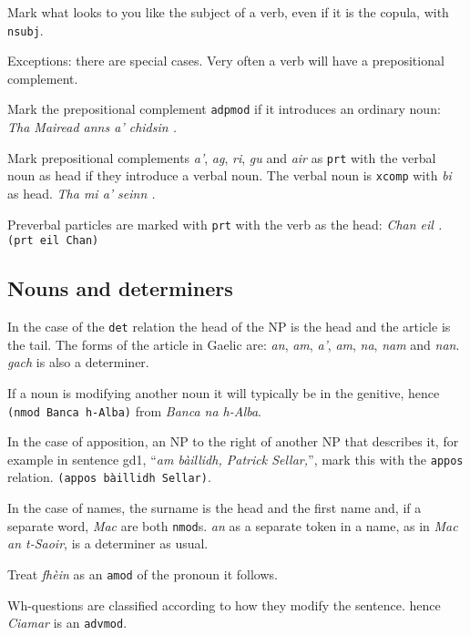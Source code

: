 \documentclass[a4paper]{article}
\begin{document}
 Mark what looks to you like the subject of a verb, even if it is the copula, with \texttt{nsubj}.

Exceptions: there are special cases.
Very often a verb will have a prepositional complement.

 Mark the prepositional complement \texttt{adpmod} if it introduces an ordinary noun: \textit{Tha Mairead anns a' chidsin .}

 Mark prepositional complements \textit{a'}, \textit{ag}, \textit{ri}, \textit{gu} and \textit{air} as \texttt{prt} with the verbal noun as head if they introduce a verbal noun. The verbal noun is \texttt{xcomp} with \textit{bi} as head. \textit{Tha mi a' seinn .}

 Preverbal particles are marked with \texttt{prt} with the verb as the head: \textit{Chan eil .} \texttt{(prt eil Chan)} 

\subsection{Nouns and determiners}

 In the case of the \texttt{det} relation the head of the NP is the head and the article is the tail. The forms of the article in Gaelic are: \textit{an}, \textit{am}, \textit{a'}, \textit{am}, \textit{na}, \textit{nam} and \textit{nan}.
\textit{gach} is also a determiner.

 If a noun is modifying another noun it will typically be in the genitive, hence \texttt{(nmod Banca h-Alba)} from \textit{Banca na h-Alba}.

 In the case of apposition, an NP to the right of another NP that describes it, for example in sentence gd1, ``\textit{am b\`aillidh, Patrick Sellar,}'', mark this with the \texttt{appos} relation. \texttt{(appos b\`aillidh Sellar)}. 

 In the case of names, the surname is the head and the first name and, if a separate word, \textit{Mac} are both \texttt{nmod}s. \textit{an} as a separate token in a name, as in \textit{Mac an t-Saoir}, is a determiner as usual.

 Treat \textit{fh\`ein} as an \texttt{amod} of the pronoun it follows.

 Wh-questions are classified according to how they modify the sentence. hence \textit{Ciamar} is an \texttt{advmod}.
\end{document}
